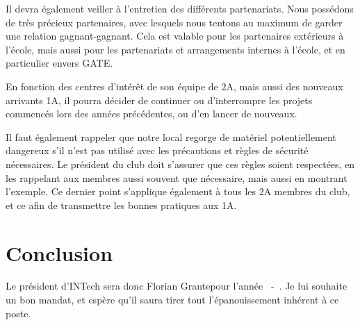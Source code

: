 \documentclass[a4paper,10pt]{article}
\newcommand{\nouveauprez}{Florian Grante}
\newcounter{annee}
\newcounter{anneesuiv}
\begin{document}
Il devra également veiller à l'entretien des différents partenariats. Nous possédons de très précieux partenaires, avec lesquels nous tentons au maximum 
de garder une relation gagnant-gagnant. Cela est valable pour les partenaires extérieurs à l'école, mais aussi pour les partenariats et arrangements internes 
à l'école, et en particulier envers GATE\texttrademark.\newline

En fonction des centres d'intérêt de son équipe de 2A, mais aussi des nouveaux arrivants 1A, il pourra décider de continuer ou d'interrompre les projets commencés 
lors des années précédentes, ou d'en lancer de nouveaux.\newline

Il faut également rappeler que notre local regorge de matériel potentiellement dangereux s'il n'est pas utilisé avec les précautions et règles de sécurité nécessaires.
Le président du club doit s'assurer que ces règles soient respectées, en les rappelant aux membres aussi souvent que nécessaire, mais aussi en montrant l'exemple.
Ce dernier point s'applique également à tous les 2A membres du club, et ce afin de transmettre les bonnes pratiques aux 1A.

\section{Conclusion}

Le président d'INTech sera donc \nouveauprez \space pour l'année \theannee~-~\theanneesuiv. Je lui souhaite un bon mandat, et espère qu'il saura tirer tout l'épanouissement 
inhérent à ce poste.
\end{document}
